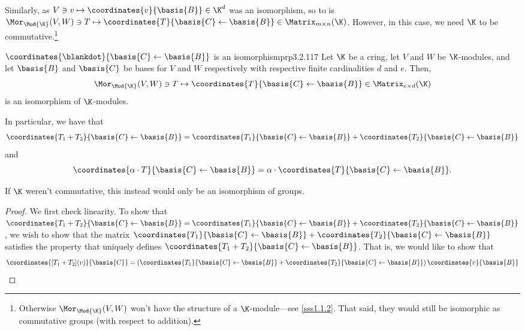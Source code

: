 Similarly, as $V\ni v\mapsto \coordinates{v}{\basis{B}}\in \K ^d$ was an isomorphism, so to is $\Mor _{\Mod{\K}}(V,W)\ni T\mapsto \coordinates{T}{\basis{C}\leftarrow \basis{B}}\in \Matrix _{m\times n}(\K )$.  However, in this case, we need $\K$ to be commutative.\footnote{Otherwise $\Mor _{\Mod{\K}}(V,W)$ won't have the structure of a $\K$-module---see \cref{sss1.1.2}.  That said, they would still be isomorphic as commutative groups (with respect to addition).}
\begin{prp}{$\coordinates{\blankdot}{\basis{C}\leftarrow \basis{B}}$ is an isomorphism}{prp3.2.117}
	Let $\K$ be a cring, let $V$ and $W$ be $\K$-modules, and let $\basis{B}$ and $\basis{C}$ be bases for $V$ and $W$ respectively with respective finite cardinalities $d$ and $e$.  Then,
	\begin{equation*}
		\Mor _{\Mod{\K}}(V,W)\ni T\mapsto \coordinates{T}{\basis{C}\leftarrow \basis{B}}\in \Matrix _{e\times d}(\K )
	\end{equation*}
	is an isomorphism of $\K$-modules.
	\begin{rmk}
		In particular, we have that
		\begin{equation}
		\coordinates{T_1+T_2}{\basis{C}\leftarrow \basis{B}}=\coordinates{T_1}{\basis{C}\leftarrow \basis{B}}+\coordinates{T_2}{\basis{C}\leftarrow \basis{B}}
		\end{equation}
		and
		\begin{equation}
		\coordinates{\alpha \cdot T}{\basis{C}\leftarrow \basis{B}}=\alpha \cdot \coordinates{T}{\basis{C}\leftarrow \basis{B}}.
		\end{equation}
	\end{rmk}
	\begin{rmk}
		If $\K$ weren't commutative, this instead would only be an isomorphism of groups.
	\end{rmk}
	\begin{proof}
		We first check linearity.  To show that $\coordinates{T_1+T_2}{\basis{C}\leftarrow \basis{B}}=\coordinates{T_1}{\basis{C}\leftarrow \basis{B}}+\coordinates{T_2}{\basis{C}\leftarrow \basis{B}}$, we wish to show that the matrix $\coordinates{T_1}{\basis{C}\leftarrow \basis{B}}+\coordinates{T_2}{\basis{C}\leftarrow \basis{B}}$ satisfies the property that uniquely defines $\coordinates{T_1+T_2}{\basis{C}\leftarrow \basis{B}}$.  That is, we would like to show that
		\begin{equation}
		\coordinates{[T_1+T_2](v)}{\basis{C}}=\left( \coordinates{T_1}{\basis{C}\leftarrow \basis{B}}+\coordinates{T_2}{\basis{C}\leftarrow \basis{B}}\right) \coordinates{v}{\basis{B}}

\end{equation}
\end{proof}
\end{prp}
